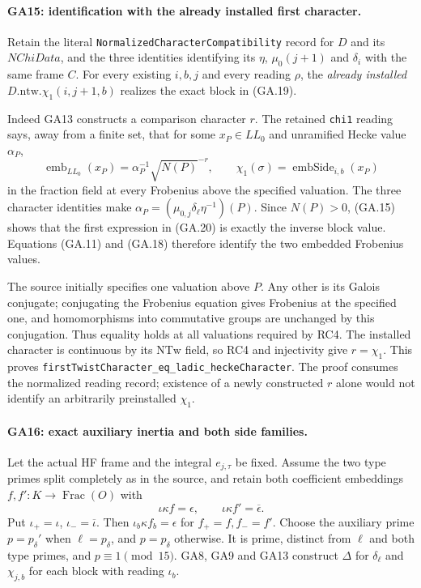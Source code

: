 \paragraph{GA15: identification with the already installed first character.}
Retain the literal \texttt{NormalizedCharacterCompatibility}
record for $D$ and its $NChiData$, and the three identities
identifying its $\eta$, $\mu_0(j+1)$ and $\delta_i$ with
the same frame $C$. For every existing $i,b,j$ and every
reading $\rho$, the \emph{already installed}
$D.\mathrm{ntw}.\chi_1(i,j+1,b)$ realizes the exact block
in (GA.19).

Indeed GA13 constructs a comparison character $r$.
The retained \texttt{chi1} reading says, away from a finite
set, that for some $x_P\in LL_0$ and unramified Hecke value
$\alpha_P$,
\[
 \operatorname{emb}_{LL_0}(x_P)
       =\alpha_P^{-1}\sqrt{N(P)}^{-r},\qquad
 \chi_1(\sigma)=\operatorname{embSide}_{i,b}(x_P)           \tag{GA.20}
\]
in the fraction field at every Frobenius above the specified
valuation. The three character identities make
$\alpha_P=(\mu_{0,j}\delta_\ell\eta^{-1})(P)$.
Since $N(P)>0$, (GA.15) shows that the first expression
in (GA.20) is exactly the inverse block value.
Equations (GA.11) and (GA.18) therefore identify the two
embedded Frobenius values.

The source initially specifies one valuation above $P$.
Any other is its Galois conjugate; conjugating the
Frobenius equation gives Frobenius at the specified one,
and homomorphisms into commutative groups are unchanged
by this conjugation. Thus equality holds at all valuations
required by RC4. The installed character is continuous
by its $\mathrm{NTw}$ field, so RC4 and injectivity give
$r=\chi_1$. This proves
\texttt{firstTwistCharacter\_eq\_ladic\_heckeCharacter}.
The proof consumes the normalized reading record; existence
of a newly constructed $r$ alone would not identify an
arbitrarily preinstalled $\chi_1$.

\paragraph{GA16: exact auxiliary inertia and both side families.}
Let the actual HF frame and the integral $e_{j,\tau}$ be
fixed. Assume the two type primes split completely as in
the source, and retain both coefficient embeddings
$f,f':K\to\operatorname{Frac}(O)$ with
\[
 \iota\kappa f=\epsilon,\qquad
 \iota\kappa f'=\overline{\epsilon}.
\]
Put $\iota_+=\iota$, $\iota_-=\overline{\iota}$.
Then $\iota_b\kappa f_b=\epsilon$ for $f_+=f,f_-=f'$.
Choose the auxiliary prime
$p=p_\delta'$ when $\ell=p_\delta$, and $p=p_\delta$
otherwise. It is prime, distinct from $\ell$ and both
type primes, and $p\equiv1\pmod{15}$.
GA8, GA9 and GA13 construct $\Delta$ for $\delta_\ell$
and $\chi_{j,b}$ for each block with reading $\iota_b$.

